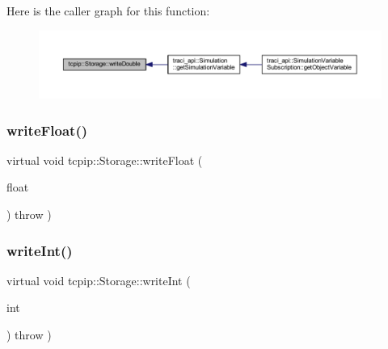 Here is the caller graph for this function\+:\nopagebreak
\begin{figure}[H]
\begin{center}
\leavevmode
\includegraphics[width=350pt]{classtcpip_1_1_storage_afb0fc2b3b7f32ac7cba3d885965e417e_icgraph}
\end{center}
\end{figure}
\mbox{\label{classtcpip_1_1_storage_ab4fc84f48f0c54fa75bedd69d7293c4c}} 
\subsubsection{\texorpdfstring{write\+Float()}{writeFloat()}}
{\footnotesize\ttfamily virtual void tcpip\+::\+Storage\+::write\+Float (\begin{DoxyParamCaption}\item[{float}]{ }\end{DoxyParamCaption}) throw  ) \hspace{0.3cm}{\ttfamily [virtual]}}

\mbox{\label{classtcpip_1_1_storage_a1babffd3cee462277796bc5b4ef6bb1a}} 
\subsubsection{\texorpdfstring{write\+Int()}{writeInt()}}
{\footnotesize\ttfamily virtual void tcpip\+::\+Storage\+::write\+Int (\begin{DoxyParamCaption}\item[{int}]{ }\end{DoxyParamCaption}) throw  ) \hspace{0.3cm}{\ttfamily [virtual]}}

